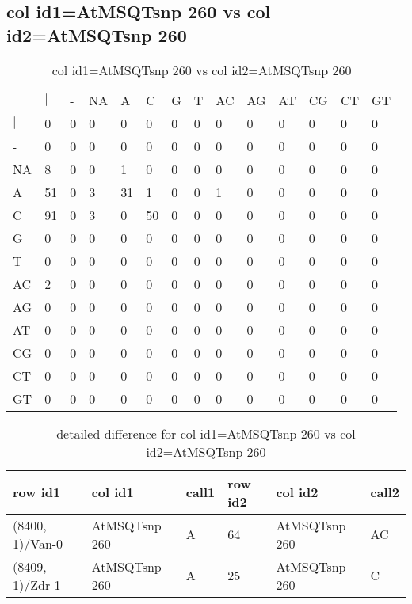 \subsection{col id1=AtMSQTsnp 260 vs col id2=AtMSQTsnp 260}
\begin{center}
\begin{longtable}{|l|l|l|l|l|l|l|l|l|l|l|l|l|l|}
\caption{col id1=AtMSQTsnp 260 vs col id2=AtMSQTsnp 260} \label{table_dm604}\\
\hline
\\
\hline
&$|$&-&NA&A&C&G&T&AC&AG&AT&CG&CT&GT\\
$|$&0&0&0&0&0&0&0&0&0&0&0&0&0\\
-&0&0&0&0&0&0&0&0&0&0&0&0&0\\
NA&8&0&0&1&0&0&0&0&0&0&0&0&0\\
A&51&0&3&31&1&0&0&1&0&0&0&0&0\\
C&91&0&3&0&50&0&0&0&0&0&0&0&0\\
G&0&0&0&0&0&0&0&0&0&0&0&0&0\\
T&0&0&0&0&0&0&0&0&0&0&0&0&0\\
AC&2&0&0&0&0&0&0&0&0&0&0&0&0\\
AG&0&0&0&0&0&0&0&0&0&0&0&0&0\\
AT&0&0&0&0&0&0&0&0&0&0&0&0&0\\
CG&0&0&0&0&0&0&0&0&0&0&0&0&0\\
CT&0&0&0&0&0&0&0&0&0&0&0&0&0\\
GT&0&0&0&0&0&0&0&0&0&0&0&0&0\\
\hline
\end{longtable}
\end{center}

\begin{center}
\begin{longtable}{|l|l|l|l|l|l|}
\caption{detailed difference for col id1=AtMSQTsnp 260 vs col id2=AtMSQTsnp 260} \label{table_dm605}\\
\hline
row id1&col id1&call1&row id2&col id2&call2\\
\hline
(8400, 1)/Van-0&AtMSQTsnp 260&A&64&AtMSQTsnp 260&AC\\
(8409, 1)/Zdr-1&AtMSQTsnp 260&A&25&AtMSQTsnp 260&C\\
\hline
\end{longtable}
\end{center}

